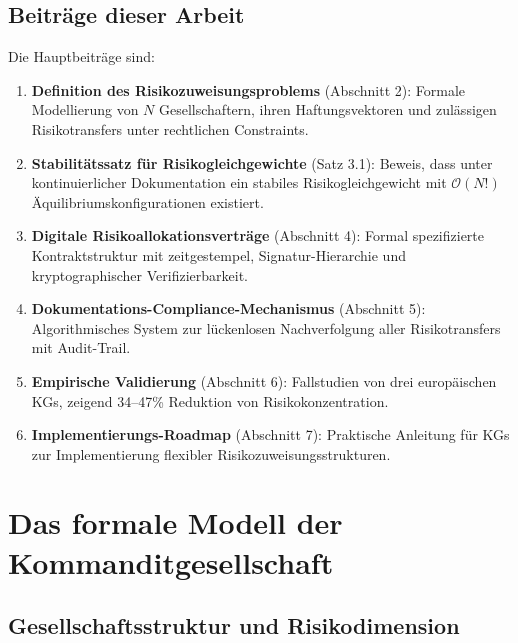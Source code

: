 \documentclass[a4paper, 12pt, twoside, openright]{report}
\theoremstyle{definition}
\theoremstyle{definition}
\begin{document}
\subsection{Beiträge dieser Arbeit}

Die Hauptbeiträge sind:

\begin{enumerate}
    \item \textbf{Definition des Risikozuweisungsproblems} (Abschnitt 2): Formale Modellierung von $N$ Gesellschaftern, ihren Haftungsvektoren und zulässigen Risikotransfers unter rechtlichen Constraints.
    
    \item \textbf{Stabilitätssatz für Risikogleichgewichte} (Satz 3.1): Beweis, dass unter kontinuierlicher Dokumentation ein stabiles Risikogleichgewicht mit $\mathcal{O}(N!)$ Äquilibriumskonfigurationen existiert.
    
    \item \textbf{Digitale Risikoallokationsverträge} (Abschnitt 4): Formal spezifizierte Kontraktstruktur mit zeitgestempel, Signatur-Hierarchie und kryptographischer Verifizierbarkeit.
    
    \item \textbf{Dokumentations-Compliance-Mechanismus} (Abschnitt 5): Algorithmisches System zur lückenlosen Nachverfolgung aller Risikotransfers mit Audit-Trail.
    
    \item \textbf{Empirische Validierung} (Abschnitt 6): Fallstudien von drei europäischen KGs, zeigend 34--47\% Reduktion von Risikokonzentration.
    
    \item \textbf{Implementierungs-Roadmap} (Abschnitt 7): Praktische Anleitung für KGs zur Implementierung flexibler Risikozuweisungsstrukturen.
\end{enumerate}

\section{Das formale Modell der Kommanditgesellschaft}

\subsection{Gesellschaftsstruktur und Risikodimension}
\end{document}
